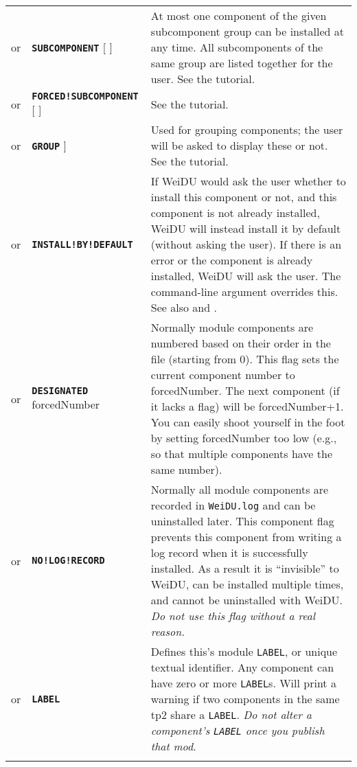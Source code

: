 \documentclass{article}
\def\ttref#1{\ahrefloc{#1}{\tt #1}}
\def\DEFINE#1{{\tt \bf #1}\label{#1}\index{#1}}
\def\DEFSYN#1{{\tt \bf #1}\index{#1}}
\def\t#1{{\tt #1}}
\def\Ob{{\color{red} [ }}
\def\Oe{{\color{red} ] }}
\begin{document}
\begin{tabular}{cp{10in}|p{10in}}
  or & \DEFSYN{SUBCOMPONENT} \ttref{String} \Ob \ttref{value} \Oe &
      At most one component of the given subcomponent group can be
      installed at any time. All subcomponents of the same group are
      listed together for the user. See the \ttref{SUBCOMPONENT}
      tutorial. \\

  or & \DEFINE{FORCED!SUBCOMPONENT} \ttref{String} \Ob \ttref{value} \Oe &
      See the \ttref{SUBCOMPONENT} tutorial. \\

  or & \DEFSYN{GROUP} \ttref{String}\Ob \ttref{value} \Oe & Used for grouping components; the user
      will be asked to display these or not. See the \ttref{GROUP} tutorial. \\

  or & \DEFINE{INSTALL!BY!DEFAULT} &
      If WeiDU would ask the user whether to install this component or not,
      and this component is not already installed, WeiDU will instead
      install it by default (without asking the user). If there is an error
      or the component is already installed, WeiDU will ask the user. The
      \ttref{--uninstall} command-line argument overrides this. See also
      \ttref{REQUIRE!COMPONENT} and \ttref{ALWAYS}.  \\

  or & \DEFINE{DESIGNATED} forcedNumber &
      Normally module components are numbered based on their order in the
      \ttref{TP2} file (starting from 0). This flag sets the current
      component number to forcedNumber. The next component (if it lacks a
      \ttref{DESIGNATED} flag) will be forcedNumber+1. You can easily shoot
      yourself in the foot by setting forcedNumber too low (e.g., so that
      multiple components have the same number). \\

  or & \DEFINE{NO!LOG!RECORD} &
      Normally all module components are recorded in \t{WeiDU.log} and can
      be uninstalled later. This component flag prevents this component
      from writing a log record when it is successfully installed. As a
      result it is ``invisible'' to WeiDU, can be installed multiple times,
      and cannot be uninstalled with WeiDU. \emph{Do not use this flag without
	  a real reason.} \\
  or & \DEFINE{LABEL} \ttref{String} &
      Defines this's module \t{LABEL}, or unique textual identifier. Any component
	  can have zero or more \t{LABEL}s. Will print a warning if two components in
      the same tp2 share a \t{LABEL}. \emph{Do not alter a component's \t{LABEL} once
	  you publish that mod}. \\
\\


\end{tabular}
\end{document}

